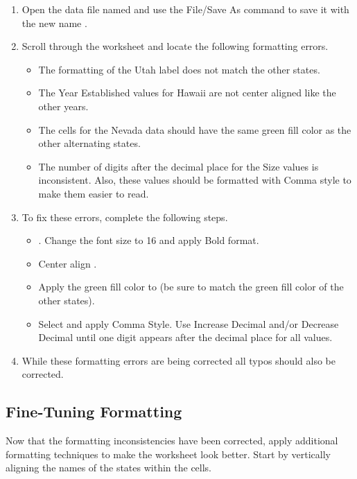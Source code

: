 \begin{enumerate}
	\item Open the data file named  and use the File/Save As command to save it with the new name .
	\item Scroll through the worksheet and locate the following formatting errors.

	\begin{itemize}
		\item The formatting of the Utah label does not match the other states.
		\item The Year Established values for Hawaii are not center aligned like the other years.
		\item The cells for the Nevada data should have the same green fill color as the other alternating states.
		\item The number of digits after the decimal place for the Size values is inconsistent. Also, these values should be formatted with Comma style to make them easier to read.
	\end{itemize}

	\item To fix these errors, complete the following steps.

	\begin{itemize}
		\item {} . Change the font size to 16 and apply Bold format.
		\item Center align .
		\item Apply the green fill color to  (be sure to match the green fill color of the other states).
		\item Select  and apply Comma Style. Use Increase Decimal and/or Decrease Decimal until one digit appears after the decimal place for all values.
	\end{itemize}
	
	\item While these formatting errors are being corrected all typos should also be corrected.
\end{enumerate}

\subsection{Fine-Tuning Formatting}

Now that the formatting inconsistencies have been corrected, apply additional formatting techniques to make the worksheet look better. Start by vertically aligning the names of the states within the cells.


